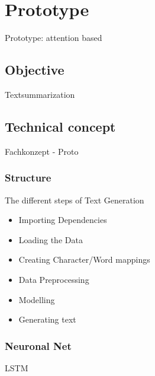 \chapter{Prototype}\label{ch:proto}

Prototype: attention based




%

\section{Objective}

Textsummarization

\section{Technical concept}

Fachkonzept - Proto

\subsection{Structure}

The different steps of Text Generation

\begin{itemize}
\item Importing Dependencies
\item Loading the Data
\item Creating Character/Word mappings
\item Data Preprocessing
\item Modelling
\item Generating text
\end{itemize}

\subsection{Neuronal Net}\label{ss:nn}

LSTM

